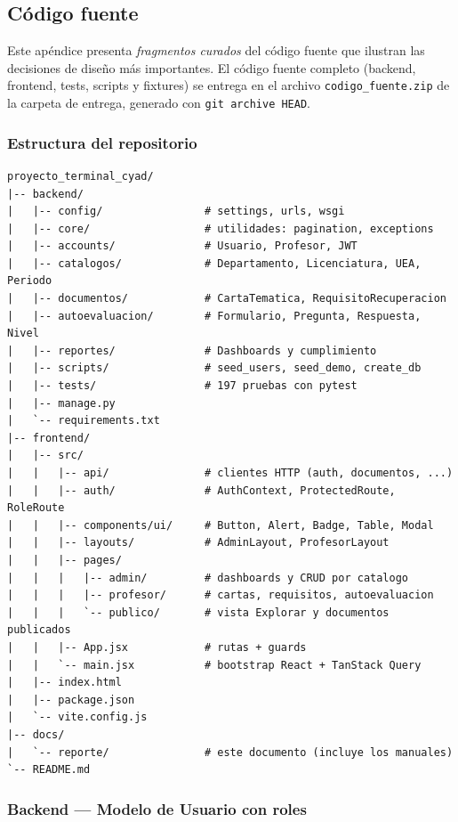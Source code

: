 \subsection{Código fuente}\label{apx:codigo}
\justifying

Este apéndice presenta \emph{fragmentos curados} del código fuente que ilustran las decisiones de diseño más importantes. El código fuente completo (backend, frontend, tests, scripts y fixtures) se entrega en el archivo \texttt{codigo\_fuente.zip} de la carpeta de entrega, generado con \texttt{git archive HEAD}.

\subsubsection{Estructura del repositorio}

\begin{lstlisting}[style=mystyle-sn]
proyecto_terminal_cyad/
|-- backend/
|   |-- config/                # settings, urls, wsgi
|   |-- core/                  # utilidades: pagination, exceptions
|   |-- accounts/              # Usuario, Profesor, JWT
|   |-- catalogos/             # Departamento, Licenciatura, UEA, Periodo
|   |-- documentos/            # CartaTematica, RequisitoRecuperacion
|   |-- autoevaluacion/        # Formulario, Pregunta, Respuesta, Nivel
|   |-- reportes/              # Dashboards y cumplimiento
|   |-- scripts/               # seed_users, seed_demo, create_db
|   |-- tests/                 # 197 pruebas con pytest
|   |-- manage.py
|   `-- requirements.txt
|-- frontend/
|   |-- src/
|   |   |-- api/               # clientes HTTP (auth, documentos, ...)
|   |   |-- auth/              # AuthContext, ProtectedRoute, RoleRoute
|   |   |-- components/ui/     # Button, Alert, Badge, Table, Modal
|   |   |-- layouts/           # AdminLayout, ProfesorLayout
|   |   |-- pages/
|   |   |   |-- admin/         # dashboards y CRUD por catalogo
|   |   |   |-- profesor/      # cartas, requisitos, autoevaluacion
|   |   |   `-- publico/       # vista Explorar y documentos publicados
|   |   |-- App.jsx            # rutas + guards
|   |   `-- main.jsx           # bootstrap React + TanStack Query
|   |-- index.html
|   |-- package.json
|   `-- vite.config.js
|-- docs/
|   `-- reporte/               # este documento (incluye los manuales)
`-- README.md
\end{lstlisting}

\subsubsection{Backend --- Modelo de Usuario con roles}

